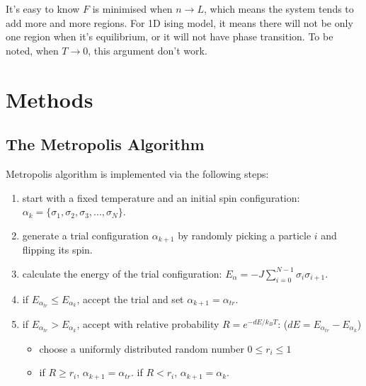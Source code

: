 \documentclass[12pt]{article}
\begin{document}
	It's easy to know $F$ is minimised when $n \to L$, which means the system tends to add more and more regions. For 1D ising model, it means there will not be only one region when it's equilibrium, or it  will not have phase transition. To be noted, when $T \to 0$, this argument don't work. 
	
	\section{Methods}
	\label{sec: methods}
	\subsection{The Metropolis Algorithm}
	\label{sec: metropolis algorithm}
	Metropolis algorithm is implemented via the following steps:
	\begin{enumerate}
		\item start with a fixed temperature and an initial spin    configuration: $\alpha_k=\{\sigma_1,\sigma_2,\sigma_3,...,\sigma_N\}$.
		
		\item generate a trial configuration $\alpha_{k+1}$ by randomly picking a particle $i$ and flipping its spin.
		
		\item calculate the energy of the trial configuration: $E_\alpha=-J \sum_{i=0}^{N-1} \sigma_i \sigma_{i+1}$.
		
		\item if $E_{\alpha_{tr}}\leq E_{\alpha_k}$, accept the trial and set $\alpha_{k+1}=\alpha_{tr}$.
		
		\item if $E_{\alpha_{tr}}> E_{\alpha_k}$, accept with relative probability $R=e^{-dE/{k_B T}}$: ($dE=E_{\alpha_{tr}}-E_{\alpha_k}$)
		\begin{itemize}
			\item choose a uniformly distributed random number $0\leq r_i \leq 1$
			
			\item if $R\geq r_i$, $\alpha_{k+1}=\alpha_{tr}$. if $R<r_i$, $\alpha_{k+1}=\alpha_k$.
		\end{itemize}
	\end{enumerate}
	
\end{document}
